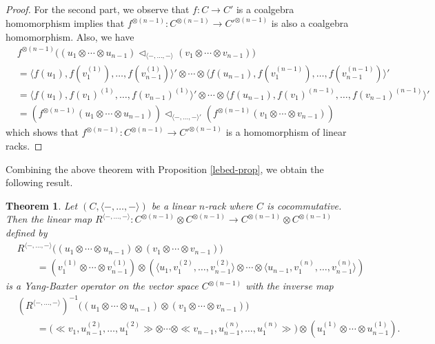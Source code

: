 \documentclass[a4paper,reqno,10pt]{amsart}
\theoremstyle{plain}
\newtheorem{thm}{Theorem}[section]
\theoremstyle{definition}
\theoremstyle{remark}
\begin{document}
\begin{proof}
     For the second part, we observe that $f : C \rightarrow C'$ is a coalgebra homomorphism implies that $f^{\otimes (n-1)} : C^{\otimes (n-1)} \rightarrow C'^{\otimes (n-1)}$ is also a coalgebra homomorphism. Also, we have
     \begin{align*}
        &f^{\otimes (n-1)} \big(    (u_1 \otimes \cdots \otimes u_{n-1}) \triangleleft_{\langle -, \ldots, - \rangle}  (v_1 \otimes \cdots \otimes v_{n-1})\big) \\
        &= \langle  f(u_1), f(v_1^{(1)}), \ldots, f (v_{n-1}^{(1)})    \rangle' \otimes \cdots \otimes \langle  f (u_{n-1}), f (v_1^{(n-1)}), \ldots, f (v_{n-1}^{(n-1)}) \rangle' \\
        &= \langle  f(u_1), f(v_1)^{(1)}, \ldots, f (v_{n-1})^{(1)}    \rangle' \otimes \cdots \otimes \langle  f (u_{n-1}), f (v_1)^{(n-1)}, \ldots, f (v_{n-1})^{(n-1)} \rangle' \\
        &= (f^{\otimes (n-1)} (u_1 \otimes \cdots \otimes u_{n-1})) \triangleleft_{\langle -, \ldots, - \rangle'} (f^{\otimes (n-1)} (v_1 \otimes \cdots \otimes v_{n-1}))
     \end{align*}
     which shows that $f^{\otimes (n-1)} : C^{\otimes (n-1)} \rightarrow C'^{\otimes (n-1)}$ is a homomorphism of linear racks.
\end{proof}

Combining the above theorem with Proposition \ref{lebed-prop}, we obtain the following result.

\begin{thm}\label{thm-lin-n-soln}
    Let $(C, \langle - , \ldots, - \rangle)$ be a linear $n$-rack where $C$ is cocommutative. Then the linear map $R^{\langle -, \ldots, - \rangle} : C^{\otimes (n-1)} \otimes C^{\otimes (n-1)} \rightarrow C^{\otimes (n-1)} \otimes C^{\otimes (n-1)}$ defined by
    \begin{align*}
        &R^{\langle -, \ldots, - \rangle} \big( (u_1 \otimes \cdots \otimes u_{n-1}) \otimes (v_1 \otimes \cdots \otimes v_{n-1})  \big) \\
        & \qquad = (v_1^{(1)} \otimes \cdots \otimes v^{(1)}_{n-1}) \otimes ( \langle u_1, v_1^{(2)}, \ldots, v_{n-1}^{(2)} \rangle \otimes \cdots \otimes \langle u_{n-1}, v_1^{(n)}, \ldots, v_{n-1}^{(n)} \rangle)
    \end{align*}
    is a Yang-Baxter operator on the vector space $C^{\otimes (n-1)}$ with the inverse map
    \begin{align*}
        &(R^{\langle -, \ldots, - \rangle})^{-1}  \big( (u_1 \otimes \cdots \otimes u_{n-1}) \otimes (v_1 \otimes \cdots \otimes v_{n-1})  \big) \\
        & \qquad = \big(  \ll v_1, u_{n-1}^{(2)}, \ldots, u_{1}^{(2)} \gg \otimes  \cdots \otimes  \ll v_{n-1}, u_{n-1}^{(n)}, \ldots, u_{1}^{(n)} \gg   \big) \otimes (u_1^{(1)} \otimes \cdots \otimes u_{n-1}^{(1)}).
    \end{align*}
\end{thm}
\end{document}
